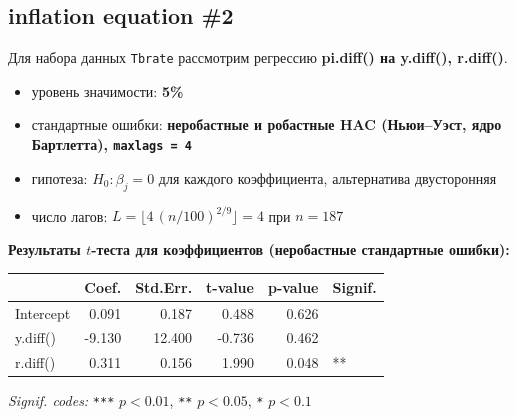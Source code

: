 \documentclass[
  russian,
]{article}
\newcounter{none} %
\providecommand{\tightlist}{%
  \setlength{\itemsep}{0pt}\setlength{\parskip}{0pt}}
\begin{document}
\subsection{inflation equation \#2}\label{inflation-equation-2-1}

Для набора данных \texttt{Tbrate} рассмотрим регрессию \textbf{pi.diff()
на y.diff(), r.diff()}.

\begin{tcolorbox}[enhanced jigsaw, arc=.35mm, bottomrule=.15mm, bottomtitle=1mm, breakable, colback=white, colbacktitle=quarto-callout-important-color!10!white, colframe=quarto-callout-important-color-frame, coltitle=black, left=2mm, leftrule=.75mm, opacityback=0, opacitybacktitle=0.6, rightrule=.15mm, title=\textcolor{quarto-callout-important-color}{\faExclamation}\hspace{0.5em}{Условия теста}, titlerule=0mm, toprule=.15mm, toptitle=1mm]

\begin{itemize}
\tightlist
\item
  уровень значимости: \textbf{5\%}
\item
  стандартные ошибки: \textbf{неробастные и робастные HAC (Ньюи--Уэст,
  ядро Бартлетта), \texttt{maxlags\ =\ 4}}
\item
  гипотеза: \(H_0:\beta_j=0\) для каждого коэффициента, альтернатива
  двусторонняя
\item
  число лагов: \(L=\lfloor 4\,(n/100)^{2/9}\rfloor = 4\) при \(n=187\)
\end{itemize}

\end{tcolorbox}

\textbf{Результаты \(t\)-теста для коэффициентов (неробастные
стандартные ошибки):}

{\def\LTcaptype{none} %
\begin{longtable}[]{@{}lrrrrl@{}}
\toprule\noalign{}
& Coef. & Std.Err. & t-value & p-value & Signif. \\
\midrule\noalign{}
\endhead
\bottomrule\noalign{}
\endlastfoot
Intercept & 0.091 & 0.187 & 0.488 & 0.626 & \\
y.diff() & -9.130 & 12.400 & -0.736 & 0.462 & \\
r.diff() & 0.311 & 0.156 & 1.990 & 0.048 & ** \\
\end{longtable}
}

\emph{Signif. codes:} \texttt{***} \(p<0.01\), \texttt{**} \(p<0.05\),
\texttt{*} \(p<0.1\)
\end{document}

